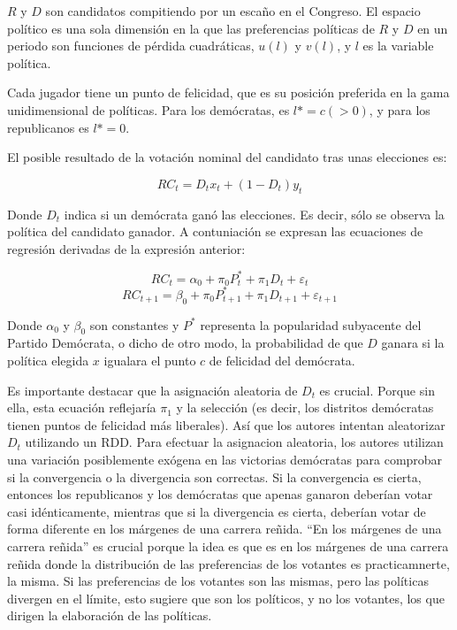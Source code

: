 \documentclass[
]{article}
\begin{document}
\(R\) y \(D\) son candidatos compitiendo por un escaño en el Congreso.
El espacio político es una sola dimensión en la que las preferencias
políticas de \(R\) y \(D\) en un periodo son funciones de pérdida
cuadráticas, \(u(l)\) y \(v(l)\), y \(l\) es la variable política.

Cada jugador tiene un punto de felicidad, que es su posición preferida
en la gama unidimensional de políticas. Para los demócratas, es
\(l* =c(>0)\), y para los republicanos es \(l* = 0\).

El posible resultado de la votación nominal del candidato tras unas
elecciones es:

\[RC_t= D_t x_t+(1-D_t)y_t\]

Donde \(D_t\) indica si un demócrata ganó las elecciones. Es decir, sólo
se observa la política del candidato ganador. A contuniación se expresan
las ecuaciones de regresión derivadas de la expresión anterior:

\[RC_t= \alpha_0 +\pi_0 P^{*}_t+\pi_1 D_t+\varepsilon_t \]
\[RC_{t+1}= \beta_0 +\pi_0 P^{*}_{t+1}+\pi_1 D_{t+1}+\varepsilon_{t+1}\]

Donde \(\alpha_0\) y \(\beta_0\) son constantes y \(P^{*}\) representa
la popularidad subyacente del Partido Demócrata, o dicho de otro modo,
la probabilidad de que \(D\) ganara si la política elegida \(x\)
igualara el punto \(c\) de felicidad del demócrata.

Es importante destacar que la asignación aleatoria de \(D_t\) es
crucial. Porque sin ella, esta ecuación reflejaría \(\pi_1\) y la
selección (es decir, los distritos demócratas tienen puntos de felicidad
más liberales). Así que los autores intentan aleatorizar \(D_t\)
utilizando un RDD. Para efectuar la asignacion aleatoria, los autores
utilizan una variación posiblemente exógena en las victorias demócratas
para comprobar si la convergencia o la divergencia son correctas. Si la
convergencia es cierta, entonces los republicanos y los demócratas que
apenas ganaron deberían votar casi idénticamente, mientras que si la
divergencia es cierta, deberían votar de forma diferente en los márgenes
de una carrera reñida. ``En los márgenes de una carrera reñida'' es
crucial porque la idea es que es en los márgenes de una carrera reñida
donde la distribución de las preferencias de los votantes es
practicamnerte, la misma. Si las preferencias de los votantes son las
mismas, pero las políticas divergen en el límite, esto sugiere que son
los políticos, y no los votantes, los que dirigen la elaboración de las
políticas.
\end{document}
